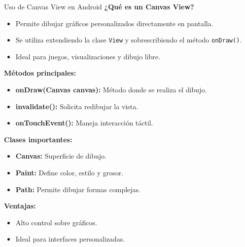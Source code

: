 \begin{frame}[fragile]{Uso de Canvas View en Android}
\textbf{¿Qué es un Canvas View?}

\begin{itemize}
    \item Permite dibujar gráficos personalizados directamente en pantalla.
    \item Se utiliza extendiendo la clase \texttt{View} y sobrescribiendo el método \texttt{onDraw()}.
    \item Ideal para juegos, visualizaciones y dibujo libre.
\end{itemize}


\textbf{Métodos principales:}
\begin{itemize}
    \item \textbf{onDraw(Canvas canvas):} Método donde se realiza el dibujo.
    \item \textbf{invalidate():} Solicita redibujar la vista.
    \item \textbf{onTouchEvent():} Maneja interacción táctil.
\end{itemize}


\textbf{Clases importantes:}
\begin{itemize}
    \item \textbf{Canvas:} Superficie de dibujo.
    \item \textbf{Paint:} Define color, estilo y grosor.
    \item \textbf{Path:} Permite dibujar formas complejas.
\end{itemize}


\textbf{Ventajas:}
\begin{itemize}
    \item Alto control sobre gráficos.
    \item Ideal para interfaces personalizadas.
\end{itemize}

\end{frame}



